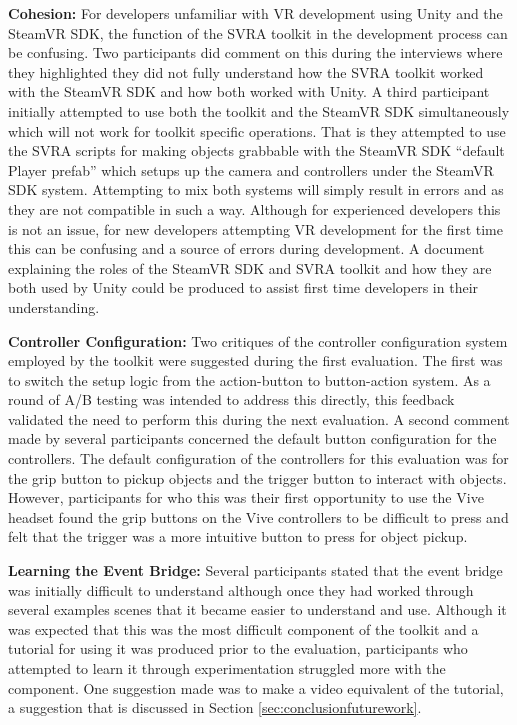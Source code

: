 \documentclass{l4proj}
\begin{document}
\textbf{Cohesion:} For developers unfamiliar with VR development using Unity and the SteamVR SDK, the function of the SVRA toolkit in the development process can be confusing. Two participants did comment on this during the interviews where they highlighted they did not fully understand how the SVRA toolkit worked with the SteamVR SDK and how both worked with Unity. A third participant initially attempted to use both the toolkit and the SteamVR SDK simultaneously which will not work for toolkit specific operations. That is they attempted to use the SVRA scripts for making objects grabbable with the SteamVR SDK ``default Player prefab'' which setups up the camera and controllers under the SteamVR SDK system. Attempting to mix both systems will simply result in errors and as they are not compatible in such a way. Although for experienced developers this is not an issue, for new developers attempting VR development for the first time this can be confusing and a source of errors during development. A document explaining the roles of the SteamVR SDK and SVRA toolkit and how they are both used by Unity could be produced to assist first time developers in their understanding.
 
\textbf{Controller Configuration:} Two critiques of the controller configuration system employed by the toolkit were suggested during the first evaluation. The first was to switch the setup logic from the action-button to button-action system. As a round of A/B testing was intended to address this directly, this feedback validated the need to perform this during the next evaluation. A second comment made by several participants concerned the default button configuration for the controllers. The default configuration of the controllers for this evaluation was for the grip button to pickup objects and the trigger button to interact with objects. However, participants for who this was their first opportunity to use the Vive headset found the grip buttons on the Vive controllers to be difficult to press and felt that the trigger was a more intuitive button to press for object pickup. 

\textbf{Learning the Event Bridge:} Several participants stated that the event bridge was initially difficult to understand although once they had worked through several examples scenes that it became easier to understand and use. Although it was expected that this was the most difficult component of the toolkit and a tutorial for using it was produced prior to the evaluation, participants who attempted to learn it through experimentation struggled more with the component. One suggestion made was to make a video equivalent of the tutorial, a suggestion that is discussed in Section \ref{sec:conclusionfuturework}.
\end{document}
